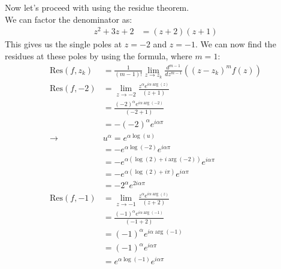 \begin{example}
    Now let's proceed with using the residue theorem.\\
    We can factor the denominator as:
    \begin{align*}
        z^2 + 3z + 2 & = (z + 2)(z + 1)
    \end{align*}
    This gives us the single poles at $z = -2$ and $z = -1$. We can now find the residues at these poles by using the formula, where $m = 1$:
    \begin{align*}
        \text{Res}(f, z_k) & = \frac{1}{(m - 1)!}\lim_{z \to z_k} \frac{d^{m-1}}{dz^{m-1}} ((z - z_k)^m f(z)) \\
        \text{Res}(f, -2)  & = \lim_{z \to -2} \frac{z^\alpha e^{i\alpha\arg(z)}}{(z + 1)}                    \\
                           & = \frac{(-2)^\alpha e^{i\alpha\arg(-2)}}{(-2 + 1)}                               \\
                           & = -(-2)^\alpha e^{i\alpha\pi}                                                    \\
        \rightarrow        & u^\alpha = e^{\alpha \log(u)}                                                    \\
                           & = -e^{\alpha \log(-2)} e^{i\alpha\pi}                                            \\
                           & = -e^{\alpha (\log(2) + i\arg(-2))} e^{i\alpha\pi}                               \\
                           & = -e^{\alpha (\log(2) + i\pi)} e^{i\alpha\pi}                                    \\
                           & = -2^\alpha e^{2i\alpha\pi}                                                      \\
        \text{Res}(f, -1)  & = \lim_{z \to -1} \frac{z^\alpha e^{i\alpha\arg(z)}}{(z + 2)}                    \\
                           & = \frac{(-1)^\alpha e^{i\alpha\arg(-1)}}{(-1 + 2)}                               \\
                           & = (-1)^\alpha e^{i\alpha\arg(-1)}                                                \\
                           & = (-1)^\alpha e^{i\alpha\pi}                                                     \\
                           & = e^{\alpha \log(-1)} e^{i\alpha\pi}                                             \\

\end{align*}
\end{example}

